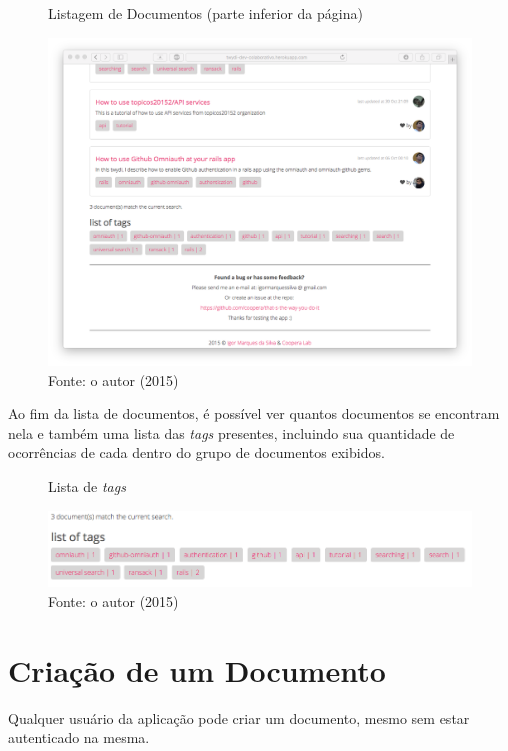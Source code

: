 \begin{figure}[h]
	\centering
    \caption{Listagem de Documentos (parte inferior da página)}
    \includegraphics[width=15cm]{Imagens/print-lista-2.png}
	\caption*{Fonte: o autor (2015)}
\end{figure}

Ao fim da lista de documentos, é possível ver quantos documentos se encontram nela e também uma lista das \textit{tags} presentes, incluindo sua quantidade de ocorrências de cada dentro do grupo de documentos exibidos.

\begin{figure}[h]
	\centering
    \caption{Lista de \textit{tags}}
    \includegraphics[width=15cm]{Imagens/print-tags.png}
	\caption*{Fonte: o autor (2015)}
\end{figure}


\section{Criação de um Documento}

Qualquer usuário da aplicação pode criar um documento, mesmo sem estar autenticado na mesma.

